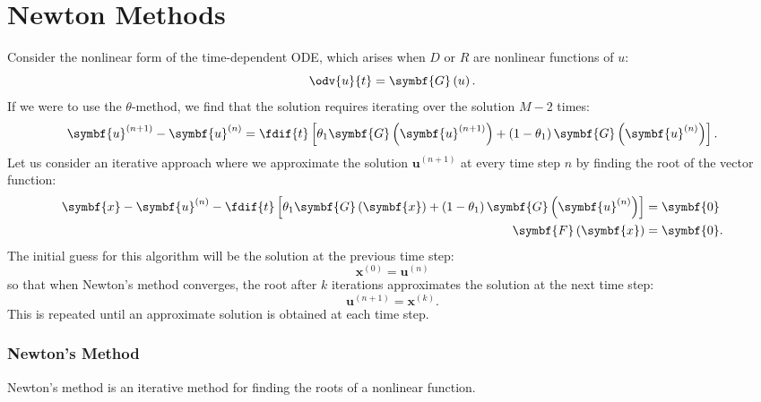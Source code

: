 \documentclass{article}
\begin{document}
\part{Newton Methods}
Consider the nonlinear form of the time-dependent ODE, which arises
when \(D\) or \(R\) are nonlinear functions of \(u\):
\begin{equation*}
    \odv{u}{t} = \symbf{G}\left( u \right).
\end{equation*}
If we were to use the \(\theta\)-method, we find that the solution requires
iterating over the solution \(M-2\) times:
\begin{equation*}
    \symbf{u}^{\left( n+1 \right)} - \symbf{u}^{\left( n \right)} = \fdif{t} \left[ \theta_1 \symbf{G}\left( \symbf{u}^{\left( n+1 \right)} \right) + \left( 1 - \theta_1 \right) \symbf{G}\left( \symbf{u}^{\left( n \right)} \right) \right].
\end{equation*}
Let us consider an iterative approach where we approximate the solution
\(\symbf{u}^{\left( n+1 \right)}\) at every time step \(n\) by finding
the root of the vector function:
\begin{align*}
    \symbf{x} - \symbf{u}^{\left( n \right)} - \fdif{t} \left[ \theta_1 \symbf{G}\left( \symbf{x} \right) + \left( 1 - \theta_1 \right) \symbf{G}\left( \symbf{u}^{\left( n \right)} \right) \right] & = \symbf{0}  \\
    \symbf{F}\left( \symbf{x} \right)                                                                                                                                                                & = \symbf{0}.
\end{align*}
The initial guess for this algorithm will be the solution at the previous
time step:
\begin{equation*}
    \symbf{x}^{\left( 0 \right)} = \symbf{u}^{\left( n \right)}
\end{equation*}
so that when Newton's method converges, the root after \(k\) iterations
approximates the solution at the next time step:
\begin{equation*}
    \symbf{u}^{\left( n+1 \right)} = \symbf{x}^{\left( k \right)}.
\end{equation*}
This is repeated until an approximate solution is obtained at each time
step.
\section{Newton's Method}
Newton's method is an iterative method for finding the roots of a
nonlinear function.
\end{document}
